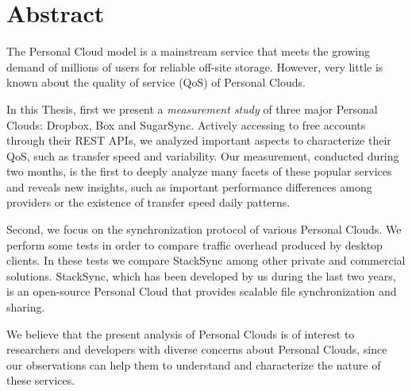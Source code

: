\chapter*{Abstract}

The Personal Cloud model is a mainstream service that meets the growing demand of millions of users for reliable off-site storage.
However, very little is known about the quality of service (QoS) of Personal Clouds.

In this Thesis, first we present a \textit{measurement study} of three major Personal Clouds:
Dropbox, Box and SugarSync. Actively accessing to free accounts through their REST APIs, we analyzed important aspects to characterize their QoS, such as transfer speed and variability. Our measurement, conducted during two months, is the first to deeply analyze many facets of these popular services and reveals new insights, such as important performance differences among providers or the existence of transfer speed daily patterns.

Second, we focus on the synchronization protocol of various Personal Clouds. We perform some tests in order to
compare traffic overhead produced by desktop clients. In these tests we compare StackSync among other private and commercial solutions. StackSync, which has been developed by us during the last two years, is an open-source Personal Cloud that
provides scalable file synchronization and sharing.

We believe that the present analysis of Personal Clouds is of interest to researchers and developers with diverse concerns about Personal Clouds, since our observations can help them to understand and characterize the nature of these services.


